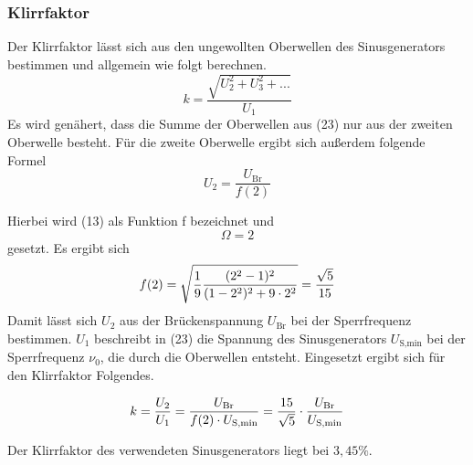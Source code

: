 \subsubsection{Klirrfaktor}
Der Klirrfaktor lässt sich aus den ungewollten Oberwellen des Sinusgenerators bestimmen und allgemein wie folgt berechnen.
\begin{equation}
    k = \frac{\sqrt{U_2^2 + U_3^2 + ...}}{U_1}
\end{equation}
Es wird genähert, dass die Summe der Oberwellen aus (23) nur aus der zweiten Oberwelle besteht.
Für die zweite Oberwelle ergibt sich außerdem folgende Formel
\begin{equation}
    U_2 = \frac{U_\text{Br}}{f(2)}
\end{equation}

Hierbei wird (13) als Funktion f bezeichnet und
\begin{equation*}
    \Omega = 2
\end{equation*} gesetzt.
Es ergibt sich
\begin{equation}
	f(2) = \sqrt{\frac{1}{9}\frac{(2^2 - 1)^2}{(1-2^2)^2 + 9 \cdot 2^2}} = \frac{\sqrt{5}}{15} \notag
\end{equation}
Damit lässt sich $U_2$ aus der Brückenspannung $U_\text{Br}$ bei der Sperrfrequenz bestimmen.
$U_1$ beschreibt in (23) die Spannung des Sinusgenerators $U_\text{S,min}$ bei der Sperrfrequenz $\nu_0$, die durch die Oberwellen entsteht.
Eingesetzt ergibt sich für den Klirrfaktor Folgendes.

\begin{equation}
    k = \frac{U_2}{U_1} = \frac{U_\text{Br}}{f(2) \cdot U_\text{S,min}} = \frac{15}{\sqrt{5}} \cdot \frac{U_\text{Br}}{U_\text{S,min}} \notag
\end{equation}

Der Klirrfaktor des verwendeten Sinusgenerators liegt bei $3,45\%$.
